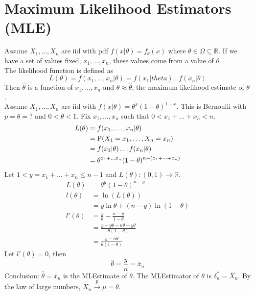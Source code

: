 \documentclass[12pt]{article}
\begin{document}
\section{Maximum Likelihood Estimators (MLE)}
Assume $X_1,\dots,X_n$ are iid with pdf $f(x|\theta) = f_\theta(x)$ where $\theta \in \Omega \subseteq \mathbb{R}$. If we have a set of values fixed, $x_1,\dots,x_n$, these values come from a value of $\theta$. \\ 
The likelihood function is defined as $$L(\theta) = f(x_1,\dots,x_n | \theta) = f(x_1|theta)\dots f(x_n|\theta)$$ 
Then $\hat{\theta}$ is a function of $x_1,\dots,x_n$ and $\theta \approx \hat{\theta}$, the maximum likelihood estimate of $\theta$. \\
Assume $X_1,\dots,X_n$ are iid with $f(x|\theta) = \theta^x(1-\theta)^{1-x}$. This is Bernoulli with $p = \theta = ?$ and $0 < \theta < 1$. Fix $x_1,\dots,x_n$ such that $0 < x_1 + \dots + x_n < n$. $$ \begin{aligned} L(\theta) &= f(x_1,\dots,x_n|\theta) \\ &= \mathrm{P}( X_1 = x_1,\dots,X_n = x_n ) \\ &= f(x_1|\theta)\dots f(x_n|\theta) \\ &= \theta^{x_1 + \dots x_n}(1 - \theta)^{n - (x_1 + \dots + x_n)} \end{aligned} $$ Let $1 < y = x_1 + \dots + x_n \leq n-1$ and $L(\theta): (0,1) \to \mathbb{R}$. 
$$ \begin{aligned} L(\theta) &= \theta^y(1 - \theta)^{n-y} \\ l(\theta) &= \ln (L(\theta)) \\ &= y\ln \theta + (n-y)\ln(1-\theta) \\ l'(\theta) &= \frac{y}{\theta} - \frac{n-y}{1-\theta} \\ &= \frac{y - y\theta - n\theta + y\theta}{\theta(1-\theta)} \\ &= \frac{y-n\theta}{\theta(1-\theta)} \end{aligned} $$ 
Let $l'(\theta) = 0$, then $$\hat{\theta} = \frac{y}{n} = \overline{x}_n$$ 
Conclusion: $\hat{\theta} = \overline{x}_n$ is the MLEstimate of $\theta$. The MLEstimator of $\theta$ is $\delta_n^* = \overline{X}_n$. By the law of large numbers, $\overline{X}_n \stackrel{p}{\to} \mu = \theta $. \\~\\
\end{document}
